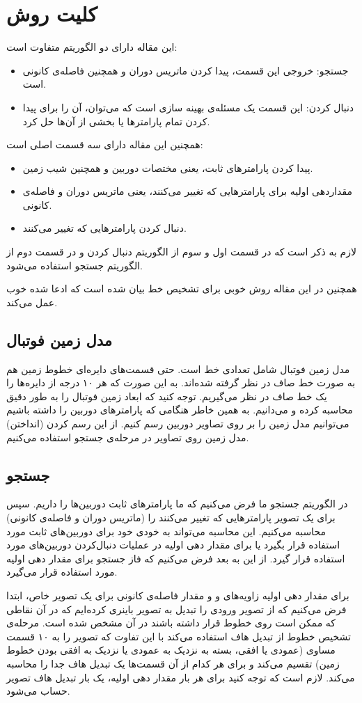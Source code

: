 \documentclass{report}
\begin{document}
\section{کلیت روش}
این مقاله دارای دو الگوریتم متفاوت است:
\begin{itemize}
\item
جستجو: خروجی این قسمت، پیدا کردن ماتریس دوران و همچنین فاصله‌ی کانونی است.
\item
دنبال کردن: این قسمت یک مسئله‌ی بهینه سازی است که می‌توان، آن را برای پیدا کردن تمام پارامترها یا بخشی از آن‌ها حل کرد.
\end{itemize}
همچنین این مقاله دارای سه قسمت اصلی است:
\begin{itemize}
\item
پیدا کردن پارامترهای ثابت، یعنی مختصات دوربین و همچنین شیب زمین.
\item
مقداردهی اولیه برای پارامترهایی که تغییر می‌کنند، یعنی ماتریس دوران و فاصله‌ی کانونی.
\item
دنبال کردن پارامترهایی که تغییر می‌کنند.
\end{itemize}
لازم به ذکر است که در قسمت اول و سوم از الگوریتم دنبال کردن و در قسمت دوم از الگوریتم جستجو استفاده می‌شود.

همچنین در این مقاله روش خوبی برای تشخیص خط بیان شده است که ادعا شده خوب عمل می‌کند.
\subsection{مدل زمین فوتبال}
مدل زمین فوتبال شامل تعدادی خط است. حتی قسمت‌های دایر‌ه‌ای خطوط زمین هم به صورت خط صاف در نظر گرفته شده‌اند. به این صورت که هر ۱۰ درجه از دایره‌ها را یک خط صاف در نظر می‌گیریم. توجه کنید که ابعاد زمین فوتبال را به طور دقیق محاسبه کرده‌ و می‌دانیم. به همین خاطر هنگامی که پارامترهای دوربین را داشته باشیم می‌توانیم مدل زمین را بر روی تصاویر دوربین رسم کنیم. از این رسم کردن (انداختن) مدل زمین روی تصاویر در مرحله‌ی جستجو استفاده می‌کنیم.
\subsection{جستجو}
در الگوریتم جستجو ما فرض می‌کنیم که ما پارامترهای ثابت دوربین‌ها را داریم. سپس برای یک تصویر پارامترهایی که تغییر می‌کنند را (ماتریس دوران و فاصله‌ی کانونی) محاسبه می‌کنیم. این محاسبه می‌تواند به خودی خود برای دوربین‌های ثابت مورد استفاده قرار بگیرد یا برای مقدار دهی اولیه در عملیات دنبال‌کردن دوربین‌های مورد استفاده قرار گیرد. از این به بعد فرض می‌کنیم که فاز جستجو برای مقدار دهی اولیه مورد استفاده قرار می‌گیرد.

برای مقدار دهی اولیه زاویه‌های  و  و مقدار فاصله‌ی کانونی برای یک تصویر خاص، ابتدا فرض می‌کنیم که از تصویر ورودی را تبدیل به تصویر باینری کرده‌ایم که در آن نقاطی که ممکن است روی خطوط قرار داشته باشند در آن مشخص شده است. مرحله‌ی تشخیص خطوط از تبدیل هاف استفاده می‌کند با این تفاوت که تصویر را به ۱۰ قسمت مساوی (عمودی یا افقی، بسته به نزدیک به عمودی یا نزدیک به افقی بودن خطوط زمین) تقسیم می‌کند و برای هر کدام از آن قسمت‌ها یک تبدیل هاف جدا را محاسبه می‌کند. لازم است که توجه کنید برای هر بار مقدار دهی اولیه، یک بار تبدیل هاف تصویر حساب می‌شود.
\end{document}
